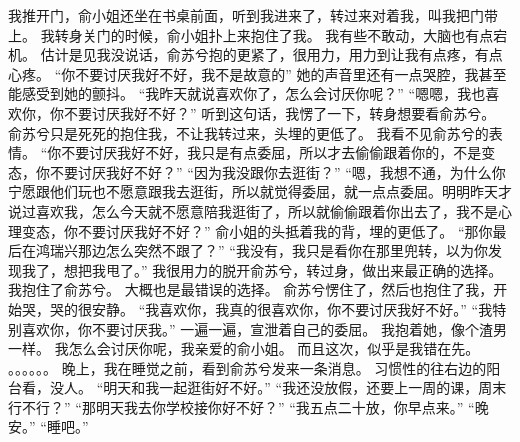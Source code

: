 我推开门，俞小姐还坐在书桌前面，听到我进来了，转过来对着我，叫我把门带上。
我转身关门的时候，俞小姐扑上来抱住了我。
我有些不敢动，大脑也有点宕机。
估计是见我没说话，俞苏兮抱的更紧了，很用力，用力到让我有点疼，有点心疼。
“你不要讨厌我好不好，我不是故意的”
她的声音里还有一点哭腔，我甚至能感受到她的颤抖。
“我昨天就说喜欢你了，怎么会讨厌你呢？”
“嗯嗯，我也喜欢你，你不要讨厌我好不好？”
听到这句话，我愣了一下，转身想要看俞苏兮。
俞苏兮只是死死的抱住我，不让我转过来，头埋的更低了。
我看不见俞苏兮的表情。
“你不要讨厌我好不好，我只是有点委屈，所以才去偷偷跟着你的，不是变态，你不要讨厌我好不好？”
“因为我没跟你去逛街？”
“嗯，我想不通，为什么你宁愿跟他们玩也不愿意跟我去逛街，所以就觉得委屈，就一点点委屈。明明昨天才说过喜欢我，怎么今天就不愿意陪我逛街了，所以就偷偷跟着你出去了，我不是心理变态，你不要讨厌我好不好？”
俞小姐的头抵着我的背，埋的更低了。
“那你最后在鸿瑞兴那边怎么突然不跟了？”
“我没有，我只是看你在那里兜转，以为你发现我了，想把我甩了。”
我很用力的脱开俞苏兮，转过身，做出来最正确的选择。
我抱住了俞苏兮。
大概也是最错误的选择。
俞苏兮愣住了，然后也抱住了我，开始哭，哭的很安静。
“我喜欢你，我真的很喜欢你，你不要讨厌我好不好。”
“我特别喜欢你，你不要讨厌我。”
一遍一遍，宣泄着自己的委屈。
我抱着她，像个渣男一样。
我怎么会讨厌你呢，我亲爱的俞小姐。
而且这次，似乎是我错在先。
。。。。。。
晚上，我在睡觉之前，看到俞苏兮发来一条消息。
习惯性的往右边的阳台看，没人。
“明天和我一起逛街好不好。”
“我还没放假，还要上一周的课，周末行不行？”
“那明天我去你学校接你好不好？”
“我五点二十放，你早点来。”
“晚安。”
“睡吧。”

